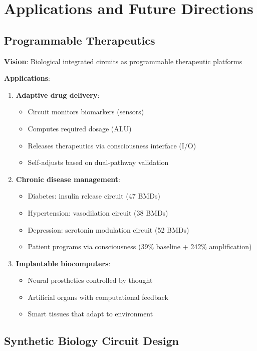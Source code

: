 \documentclass[11pt,a4paper]{article}
\begin{document}
\section{Applications and Future Directions}

\subsection{Programmable Therapeutics}

\textbf{Vision}: Biological integrated circuits as programmable therapeutic platforms

\textbf{Applications}:
\begin{enumerate}
\item \textbf{Adaptive drug delivery}:
\begin{itemize}
\item Circuit monitors biomarkers (sensors)
\item Computes required dosage (ALU)
\item Releases therapeutics via consciousness interface (I/O)
\item Self-adjusts based on dual-pathway validation
\end{itemize}

\item \textbf{Chronic disease management}:
\begin{itemize}
\item Diabetes: insulin release circuit (47 BMDs)
\item Hypertension: vasodilation circuit (38 BMDs)
\item Depression: serotonin modulation circuit (52 BMDs)
\item Patient programs via consciousness (39\% baseline + 242\% amplification)
\end{itemize}

\item \textbf{Implantable biocomputers}:
\begin{itemize}
\item Neural prosthetics controlled by thought
\item Artificial organs with computational feedback
\item Smart tissues that adapt to environment
\end{itemize}
\end{enumerate}

\subsection{Synthetic Biology Circuit Design}
\end{document}
